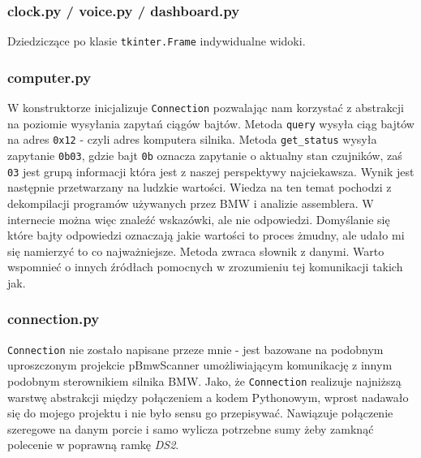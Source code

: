 \documentclass[declaration,shortabstract, inz]{iithesis}
\begin{document}
\subsubsection{clock.py / voice.py / dashboard.py}
    Dziedziczące po klasie \texttt{tkinter.Frame} indywidualne widoki.


\subsubsection{computer.py}
% 
    W konstruktorze inicjalizuje \texttt{Connection} pozwalając nam korzystać z abstrakcji na poziomie wysyłania zapytań ciągów bajtów. Metoda \texttt{query} wysyła ciąg bajtów na adres \texttt{0x12} - czyli adres komputera silnika\cite{ds2_ecu}. Metoda \texttt{get_status} wysyła zapytanie \texttt{0b03}, gdzie bajt \texttt{0b} oznacza zapytanie o aktualny stan czujników, zaś \texttt{03} jest grupą informacji która jest z naszej perspektywy najciekawsza.
    Wynik jest następnie przetwarzany na ludzkie wartości. Wiedza na ten temat pochodzi z dekompilacji programów używanych przez BMW i analizie assemblera. W internecie można więc znaleźć wskazówki, ale nie odpowiedzi. Domyślanie się które bajty odpowiedzi oznaczają jakie wartości to proces żmudny, ale udało mi się namierzyć to co najważniejsze. Metoda zwraca słownik z danymi. Warto wspomnieć o innych źródłach pomocnych w zrozumieniu tej komunikacji takich jak\cite{kline}\cite{eike}\cite{ds2pp}\cite{edblib}.

    
\subsubsection{connection.py}
% 
    \texttt{Connection} nie zostało napisane przeze mnie - jest bazowane na podobnym uproszczonym projekcie pBmwScanner\cite{pBmwScanner} umożliwiającym komunikację z innym podobnym sterownikiem silnika BMW. Jako, że \texttt{Connection} realizuje najniższą warstwę abstrakcji między połączeniem a kodem Pythonowym, wprost nadawało się do mojego projektu i nie było sensu go przepisywać. Nawiązuje połączenie szeregowe na danym porcie i samo wylicza potrzebne sumy żeby zamknąć polecenie w poprawną ramkę \textit{DS2}\cite{ds2}.
\end{document}
